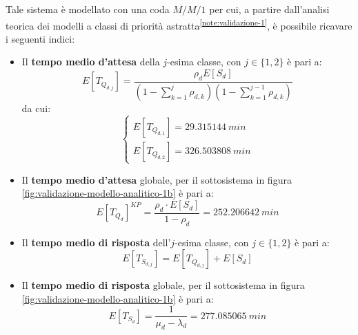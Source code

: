 Tale sistema è modellato con una coda $M/M/1$ per cui, a partire dall'analisi teorica dei modelli a classi di priorità astratta\textsuperscript{\ref{note:validazione-1}}, è possibile ricavare i seguenti indici:
\begin{itemize}
\item Il \textbf{tempo medio d'attesa} della $j$-esima classe, con $j\in\lbrace 1, 2\rbrace$ è pari a:
\begin{equation}
E[T_{Q_{d,j}}] = \frac{\rho_d E[S_d]}{\left(1- \sum_{k=1}^{j} \rho_{d,k}\right)\left(1- \sum_{k=1}^{j-1} \rho_{d,k}\right)}
\end{equation}
da cui:
\begin{equation}
\begin{cases}
E[T_{Q_{d,1}}] = 29.315144\ min \\[1.5em]
E[T_{Q_{d,2}}] = 326.503808\ min
\end{cases}
\end{equation}
\item Il \textbf{tempo medio d'attesa} globale, per il sottosistema in figura \ref{fig:validazione-modello-analitico-1b} è pari a:
\begin{equation}
E[T_{Q_d}]^{KP} = \frac{\rho_d \cdot E[S_d]}{1-\rho_d} = 252.206642\ min
\end{equation}
\item Il \textbf{tempo medio di risposta} dell'$j$-esima classe, con $j\in\lbrace 1, 2\rbrace$ è pari a:
\begin{equation}
E[T_{S_{d,j}}] = E[T_{Q_{d,j}}] + E[S_d]
\end{equation}
\item Il \textbf{tempo medio di risposta} globale, per il sottosistema in figura \ref{fig:validazione-modello-analitico-1b} è pari a:
\begin{equation}
E[T_{S_d}] = \frac{1}{\mu_d - \lambda_d} = 277.085065\ min
\end{equation}
\end{itemize}


